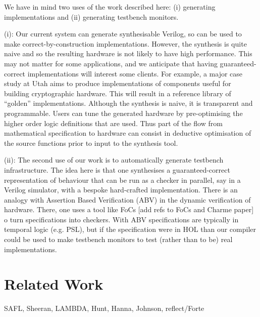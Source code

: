 \documentclass{llncs}
\begin{document}
We have in mind two uses of the work described here: (i) generating
implementations and (ii) generating testbench monitors.

(i): Our current system can generate synthesisable Verilog, so can be
used to make correct-by-construction implementations. However, the
synthesis is quite naive and so the resulting hardware is not likely
to have high performance. This may not matter for some applications,
and we anticipate that having guaranteed-correct implementations will
interest some clients. For example, a major case study at Utah aims to
produce implementations of components useful for building
cryptographic hardware.  This will result in a reference library of ``golden''
implementations. Although the synthesis is naive, it is transparent
and programmable. Users can tune the generated hardware by
pre-optimising the higher order logic definitions that are used. Thus
part of the flow from mathematical specification to hardware can
consist in deductive optimisation of the source functions prior to
input to the synthesis tool.

(ii): The second use of our work is to automatically generate testbench
infrastructure. The idea here is that one synthesises a
guaranteed-correct representation of behaviour that can be run as a checker in
parallel, say in a Verilog simulator, with a bespoke hard-crafted
implementation. There is an analogy with
Assertion Based Verification (ABV) in the dynamic verification of
hardware. There, one uses a tool like FoCs [add refs to FoCs and Charme paper] 
o turn specifications into checkers.  With ABV specifications
are typically in temporal logic (e.g.{} PSL), but if the specification
were in HOL than our compiler could be used to make
testbench monitors to test (rather than to be) real implementations.



\section{Related Work}
\label{secRelatedWork}

SAFL, Sheeran, LAMBDA, Hunt, Hanna, Johnson, reflect/Forte
\end{document}
